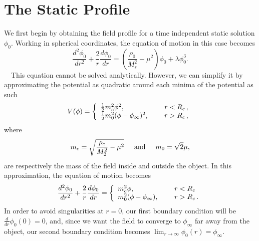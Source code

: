 \documentclass[nofootinbib,twocolumn]{revtex4}
\begin{document}
\section{\label{sec3}The Static Profile} 

We first begin by obtaining the field profile for a time independent static solution  $\phi_0$. Working in spherical coordinates, the equation of motion in this case becomes
\begin{equation}
    \frac{d^2\phi_0}{dr^2} + \frac{2}{r}\frac{d\phi_0}{dr} = \left(\frac{\rho_0}{M_s^2}-\mu^2 \right)\phi_0 +\lambda\phi_0^3.
    \label{EOMStatic}
\end{equation}
~~This equation cannot be solved analytically. However, we can simplify it by approximating the potential as quadratic around each minima of the potential as such
\begin{equation}
    V(\phi) = \left\{
\begin{array}{ll}
      \frac{1}{2}m_c^2\phi^2, & \hspace{5mm} r<R_c\,,\\
      \frac{1}{2}m_0^2(\phi-\phi_{\infty})^2, & \hspace{5mm} r>R_c \,, \\
\end{array} 
\right. 
\end{equation}
where 
\begin{equation}
m_c = \sqrt{\frac{\rho_c}{M_2^2}-\mu^2}   \hspace{5mm}  \textrm{and}   \hspace{5mm}  m_0 = \sqrt{2}\mu,
\end{equation} 
are respectively the mass of the field inside and outside the object. In this approximation, the equation of motion becomes 
\begin{equation}\label{eqBackground}
\frac{d^2\phi_0}{dr^2} + \frac{2}{r}\frac{d\phi_0}{dr} = \left\{
\begin{array}{ll}
      m_c^2\phi, & \hspace{5mm} r<R_c\\
      m_0^2(\phi-\phi_{\infty}), & \hspace{5mm} r>R_c \,. \\
\end{array} 
\right. 
\end{equation}
In order to avoid singularities at $r=0$, our first boundary condition will be $\frac{d}{dr}\phi_0(0) = 0$, and, since we want the field to converge to $\phi_{\infty}$ far away from the object, our second boundary condition becomes $\lim_{r\rightarrow\infty}\phi_0(r) = \phi_{\infty}$.
\end{document}
